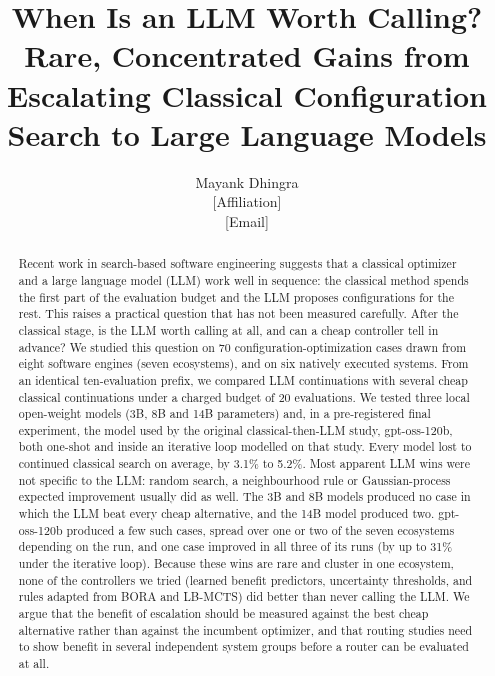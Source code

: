 \newcommand{\RQ}[1]{\textbf{RQ#1}}

\title{When Is an LLM Worth Calling?\\[4pt]
\large Rare, Concentrated Gains from Escalating Classical Configuration Search to Large Language Models}

\author{Mayank Dhingra\\
\small [Affiliation]\\
\small [Email]}

\date{}


\maketitle

\begin{abstract}
Recent work in search-based software engineering suggests that a classical optimizer and a large language model (LLM) work well in sequence: the classical method spends the first part of the evaluation budget and the LLM proposes configurations for the rest. This raises a practical question that has not been measured carefully. After the classical stage, is the LLM worth calling at all, and can a cheap controller tell in advance? We studied this question on 70 configuration-optimization cases drawn from eight software engines (seven ecosystems), and on six natively executed systems. From an identical ten-evaluation prefix, we compared LLM continuations with several cheap classical continuations under a charged budget of 20 evaluations. We tested three local open-weight models (3B, 8B and 14B parameters) and, in a pre-registered final experiment, the model used by the original classical-then-LLM study, gpt-oss-120b, both one-shot and inside an iterative loop modelled on that study. Every model lost to continued classical search on average, by 3.1\% to 5.2\%. Most apparent LLM wins were not specific to the LLM: random search, a neighbourhood rule or Gaussian-process expected improvement usually did as well. The 3B and 8B models produced no case in which the LLM beat every cheap alternative, and the 14B model produced two. gpt-oss-120b produced a few such cases, spread over one or two of the seven ecosystems depending on the run, and one case improved in all three of its runs (by up to 31\% under the iterative loop). Because these wins are rare and cluster in one ecosystem, none of the controllers we tried (learned benefit predictors, uncertainty thresholds, and rules adapted from BORA and LB-MCTS) did better than never calling the LLM. We argue that the benefit of escalation should be measured against the best cheap alternative rather than against the incumbent optimizer, and that routing studies need to show benefit in several independent system groups before a router can be evaluated at all.
\end{abstract}

